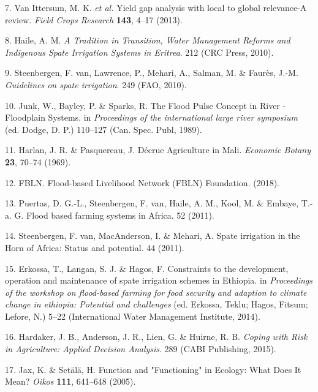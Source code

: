 \documentclass[12pt,oneside]{article}
\begin{document}
\leavevmode\hypertarget{ref-VanIttersum_et_al_2013}{}%
7. Van Ittersum, M. K. \emph{et al.} Yield gap analysis with local to global relevance-A review. \emph{Field Crops Research} \textbf{143}, 4--17 (2013).

\leavevmode\hypertarget{ref-Haile_2010}{}%
8. Haile, A. M. \emph{A Tradition in Transition, Water Management Reforms and Indigenous Spate Irrigation Systems in Eritrea}. 212 (CRC Press, 2010).

\leavevmode\hypertarget{ref-VanSteenbergen_et_al_2010}{}%
9. Steenbergen, F. van, Lawrence, P., Mehari, A., Salman, M. \& Faurès, J.-M. \emph{Guidelines on spate irrigation}. 249 (FAO, 2010).

\leavevmode\hypertarget{ref-Junk_et_al_1989}{}%
10. Junk, W., Bayley, P. \& Sparks, R. The Flood Pulse Concept in River - Floodplain Systems. in \emph{Proceedings of the international large river symposium} (ed. Dodge, D. P.) 110--127 (Can. Spec. Publ, 1989).

\leavevmode\hypertarget{ref-Harlan_Pasquereau_1969}{}%
11. Harlan, J. R. \& Pasquereau, J. Décrue Agriculture in Mali. \emph{Economic Botany} \textbf{23}, 70--74 (1969).

\leavevmode\hypertarget{ref-FBLN_2018}{}%
12. FBLN. Flood-based Livelihood Network (FBLN) Foundation. (2018).

\leavevmode\hypertarget{ref-Puertas_et_al_2011}{}%
13. Puertas, D. G.-L., Steenbergen, F. van, Haile, A. M., Kool, M. \& Embaye, T.-a. G. Flood based farming systems in Africa. 52 (2011).

\leavevmode\hypertarget{ref-VanSteenbergen_et_al_2011}{}%
14. Steenbergen, F. van, MacAnderson, I. \& Mehari, A. Spate irrigation in the Horn of Africa: Status and potential. 44 (2011).

\leavevmode\hypertarget{ref-Erkossa_et_al_2014}{}%
15. Erkossa, T., Langan, S. J. \& Hagos, F. Constraints to the development, operation and maintenance of spate irrigation schemes in Ethiopia. in \emph{Proceedings of the workshop on flood-based farming for food security and adaption to climate change in ethiopia: Potential and challenges} (ed. Erkossa, Teklu; Hagos, Fitsum; Lefore, N.) 5--22 (International Water Management Institute, 2014).

\leavevmode\hypertarget{ref-Hardaker_et_al_2015}{}%
16. Hardaker, J. B., Anderson, J. R., Lien, G. \& Huirne, R. B. \emph{Coping with Risk in Agriculture: Applied Decision Analysis}. 289 (CABI Publishing, 2015).

\leavevmode\hypertarget{ref-Jax_and_Setala_2005}{}%
17. Jax, K. \& Setälä, H. Function and "Functioning" in Ecology: What Does It Mean? \emph{Oikos} \textbf{111}, 641--648 (2005).
\end{document}
